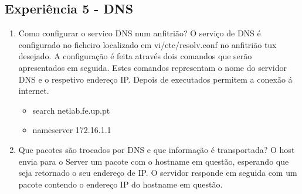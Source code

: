 \documentclass{article}
\begin{document}
\subsection{Experiência 5 - DNS}
\begin{enumerate}
\item Como configurar o servico DNS num anfitrião?
O serviço de DNS é configurado no ficheiro localizado em vi/etc/resolv.conf no anfitrião tux desejado.
A configuração é feita através dois comandos que serão apresentados em seguida. Estes comandos representam o nome do servidor DNS e o respetivo endereço IP. Depois de executados permitem a conexão á internet.
\begin{itemize}
    \item search netlab.fe.up.pt
    \item nameserver 172.16.1.1
\end{itemize}

\item Que pacotes são trocados por DNS e que informação é transportada?
O host envia para o Server um pacote com o hostname em questão, esperando que seja retornado o seu endereço de IP.
O servidor responde em seguida com um pacote contendo o endereço IP do hostname em questão.

\end{enumerate}
\end{document}
